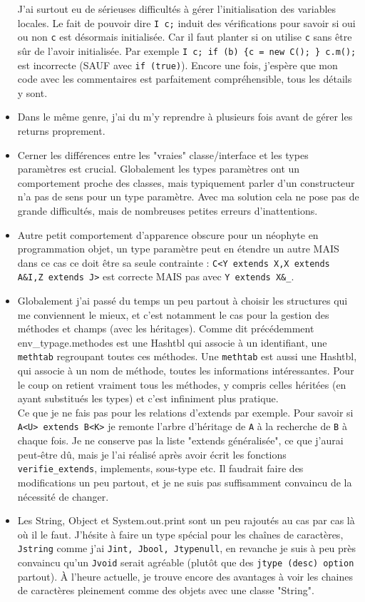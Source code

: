 \documentclass[12pt,a4paper]{report}
\begin{document}
\begin{itemize}
J'ai surtout eu de sérieuses difficultés à gérer l'initialisation des variables locales. Le fait de pouvoir dire \texttt{I c;} induit des vérifications pour savoir si oui ou non \texttt{c} est désormais initialisée. Car il faut planter si on utilise \texttt{c} sans être sûr de l'avoir initialisée. Par exemple \texttt{I c; if (b) \{c = new C(); \} c.m();} est incorrecte (SAUF avec \texttt{if (true)}). Encore une fois, j'espère que mon code avec les commentaires est parfaitement compréhensible, tous les détails y sont.
\item Dans le même genre, j'ai du m'y reprendre à plusieurs fois avant de gérer les returns proprement.
\item Cerner les différences entre les "vraies" classe/interface et les types paramètres est crucial. Globalement les types paramètres ont un comportement proche des classes, mais typiquement parler d'un constructeur n'a pas de sens pour un type paramètre. Avec ma solution cela ne pose pas de grande difficultés, mais de nombreuses petites erreurs d'inattentions.
\item Autre petit comportement d'apparence obscure pour un néophyte en programmation objet, un type paramètre peut en étendre un autre MAIS dans ce cas ce doit être sa seule contrainte : \texttt{C<Y extends X,X extends A\&I,Z extends J>} est correcte MAIS pas avec \texttt{Y extends X\&\_}.
\item Globalement j'ai passé du temps un peu partout à choisir les structures qui me conviennent le mieux, et c'est notamment le cas pour la gestion des méthodes et champs (avec les héritages). Comme dit précédemment env\_typage.methodes est une Hashtbl qui associe à un identifiant, une \texttt{methtab} regroupant toutes ces méthodes. Une \texttt{methtab} est aussi une Hashtbl, qui associe à un nom de méthode, toutes les informations intéressantes. Pour le coup on retient vraiment tous les méthodes, y compris celles héritées (en ayant substitués les types) et c'est infiniment plus pratique. \\ Ce que je ne fais pas pour les relations d'extends par exemple. Pour savoir si \texttt{A<U> extends B<K>} je remonte l'arbre d'héritage de \texttt{A} à la recherche de \texttt{B} à chaque fois. Je ne conserve pas la liste "extends généralisée", ce que j'aurai peut-être dû, mais je l'ai réalisé après avoir écrit les fonctions \texttt{verifie\_extends}, implements, sous-type etc. Il faudrait faire des modifications un peu partout, et je ne suis pas suffisamment convaincu de la nécessité de changer. 
\item Les String, Object et System.out.print sont un peu rajoutés au cas par cas là où il le faut. J'hésite à faire un type spécial pour les chaînes de caractères, \texttt{Jstring} comme j'ai \texttt{Jint, Jbool, Jtypenull}, en revanche je suis à peu près convaincu qu'un \texttt{Jvoid} serait agréable (plutôt que des \texttt{jtype (desc) option} partout). À l'heure actuelle, je trouve encore des avantages à voir les chaines de caractères pleinement comme des objets avec une classe "String".

\end{itemize}
\end{document}
